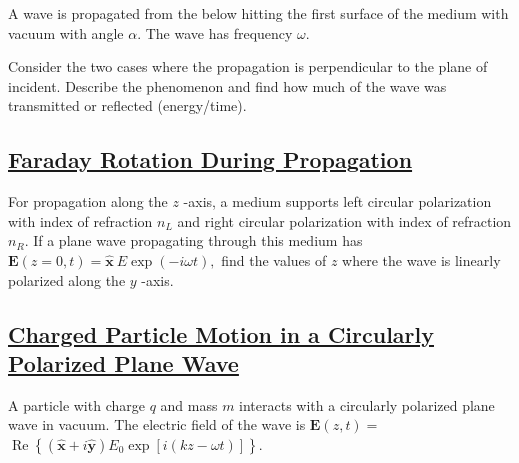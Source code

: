 A wave is propagated from the below hitting the first surface of the medium with vacuum with angle $\alpha .$ The wave has frequency $\omega$.

Consider the two cases where the propagation is perpendicular to the plane of incident. Describe the phenomenon and find how much of the wave was transmitted or reflected (energy/time).

\subsection{\hyperref[Faraday Rotation During Propagation]{Faraday Rotation During Propagation}}

For propagation along the $z$ -axis, a medium supports left circular polarization with index of refraction $n_{L}$ and right circular polarization with index of refraction $n_{R} .$ If a plane wave propagating through this medium has $\mathbf{E}(z=0, t)=\hat{\mathbf{x}}\: E \exp (-i \omega t),$ find the values of $z$ where the wave is linearly polarized along the $y$ -axis.

\subsection{\hyperref[Charged Particle Motion in a Circular Polarized wave]{Charged Particle Motion in a Circularly Polarized Plane Wave}}

A particle with charge $q$ and mass $m$ interacts with a circularly polarized plane wave in vacuum. The electric field of the wave is $\mathbf{E}(z, t)=$ $\operatorname{Re}\left\{(\hat{\mathbf{x}}+i \hat{\mathbf{y}}) E_{0} \exp [i(k z-\omega t)]\right\}$.

